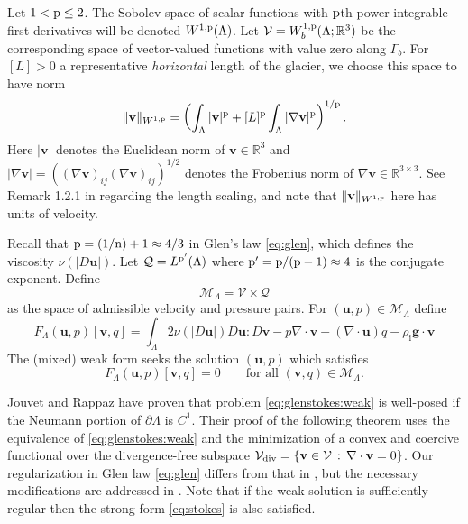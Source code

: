 \documentclass[hidelinks,onefignum,onetabnum,final]{siamart220329}  %
\newcommand{\RR}{\mathbb{R}}
\newcommand{\grad}{\nabla}
\newcommand{\Div}{\nabla\cdot}
\newcommand{\bg}{\mathbf{g}}
\newcommand{\bu}{\mathbf{u}}
\newcommand{\bv}{\mathbf{v}}
\newcommand{\cQ}{\mathcal{Q}}
\newcommand{\cV}{\mathcal{V}}
\newcommand{\nn}{{\text{\textnormal{n}}}}
\newcommand{\pp}{{\text{\textnormal{p}}}}
\newcommand{\rhoi}{\rho_{\text{i}}}
\newcommand{\Vdiv}{\cV_{\text{\textnormal{div}}}}
\begin{document}
Let $1 < \pp \le 2$.  The Sobolev space \cite{Evans2010} of scalar functions with $\pp$th-power integrable first derivatives will be denoted $W^{1,\pp}(\Lambda)$.  Let $\cV = W_b^{1,\pp}(\Lambda; \RR^3)$ be the corresponding space of vector-valued functions with value zero along $\Gamma_b$.  For $[L]>0$ a representative \emph{horizontal} length of the glacier, we choose this space to have norm
\begin{equation}
\|\bv\|_{W^{1,\pp}} = \left(\int_\Lambda |\bv|^\pp + [L]^\pp \int_\Lambda |\grad\bv|^\pp\right)^{1/\pp}.
\end{equation}
Here $|\bv|$ denotes the Euclidean norm of $\bv\in\RR^3$ and $|\grad\bv|=\left((\grad\bv)_{ij} (\grad\bv)_{ij}\right)^{1/2}$ denotes the Frobenius norm of $\grad\bv\in\RR^{3\times 3}$.  See Remark 1.2.1 in \cite{BoffiBrezziFortin2013} regarding the length scaling, and note that $\|\bv\|_{W^{1,\pp}}$ here has units of velocity.

Recall that $\pp=(1/\nn)+1\approx 4/3$ in Glen's law \eqref{eq:glen}, which defines the viscosity $\nu(|D\bu|)$.  Let $\cQ=L^{\pp'}(\Lambda)$ where $\pp'=\pp/(\pp-1)\approx 4$ is the conjugate exponent.  Define
\begin{equation}
\mathcal{M}_\Lambda = \cV \times \cQ \label{eq:glenstokes:mixedspace}
\end{equation}
as the space of admissible velocity and pressure pairs.  For $(\bu,p) \in \mathcal{M}_\Lambda$ define
\begin{equation}
F_\Lambda(\bu,p)[\bv,q] = \int_\Lambda 2 \nu(|D\bu|) D\bu : D\bv - p \Div\bv - (\Div\bu) q - \rhoi \bg \cdot \bv \label{eq:glenstokes:fcnl}
\end{equation}
The (mixed) weak form seeks the solution $(\bu,p)$ which satisfies
\begin{equation}
F_\Lambda(\bu,p)[\bv,q] = 0 \qquad \text{for all } (\bv,q) \in \mathcal{M}_\Lambda. \label{eq:glenstokes:weak}
\end{equation}

Jouvet and Rappaz \cite{JouvetRappaz2011} have proven that problem \eqref{eq:glenstokes:weak} is well-posed if the Neumann portion of $\partial\Lambda$ is $C^1$.  Their proof of the following theorem uses the equivalence of \eqref{eq:glenstokes:weak} and the minimization of a convex and coercive functional over the divergence-free subspace $\Vdiv = \{\bv\in\cV\,:\,\Div\bv=0\}$.  Our regularization in Glen law \eqref{eq:glen} differs from that in \cite{JouvetRappaz2011}, but the necessary modifications are addressed in \cite{IsaacStadlerGhattas2015}.  Note that if the weak solution is sufficiently regular then the strong form \eqref{eq:stokes} is also satisfied.
\end{document}
